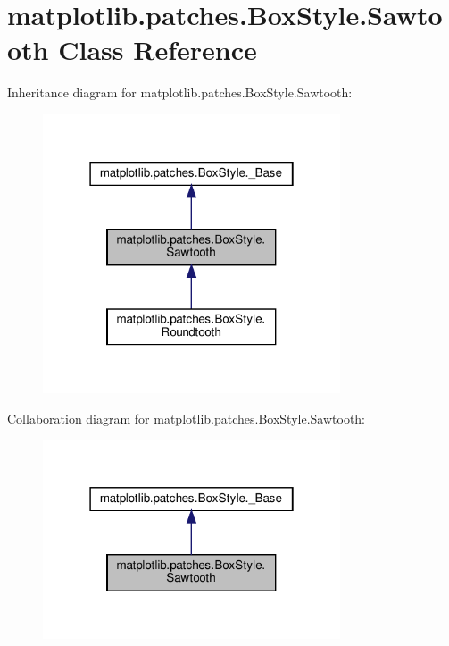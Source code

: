 \hypertarget{classmatplotlib_1_1patches_1_1BoxStyle_1_1Sawtooth}{}\section{matplotlib.\+patches.\+Box\+Style.\+Sawtooth Class Reference}
\label{classmatplotlib_1_1patches_1_1BoxStyle_1_1Sawtooth}


Inheritance diagram for matplotlib.\+patches.\+Box\+Style.\+Sawtooth\+:
\nopagebreak
\begin{figure}[H]
\begin{center}
\leavevmode
\includegraphics[width=250pt]{classmatplotlib_1_1patches_1_1BoxStyle_1_1Sawtooth__inherit__graph}
\end{center}
\end{figure}


Collaboration diagram for matplotlib.\+patches.\+Box\+Style.\+Sawtooth\+:
\nopagebreak
\begin{figure}[H]
\begin{center}
\leavevmode
\includegraphics[width=250pt]{classmatplotlib_1_1patches_1_1BoxStyle_1_1Sawtooth__coll__graph}
\end{center}
\end{figure}

